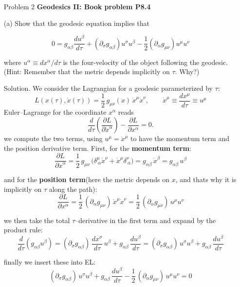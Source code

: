 \documentclass[12pt]{article}
\begin{document}
\newpage%
\begin{enumerate}
  \item[Problem 2] \textbf{Geodesics II: Book problem P8.4} 
  \item[(a)] Show that the geodesic equation implies that

  $$
  0=g_{\alpha \beta} \frac{d u^\beta}{d \tau}+\left(\partial_\sigma g_{\alpha \beta}\right) u^\sigma u^\beta-\frac{1}{2}\left(\partial_\alpha g_{\mu \nu}\right) u^\mu u^\nu
  $$
  
  where $u^\alpha \equiv d x^\alpha / d \tau$ is the four-velocity of the object following the geodesic. (Hint: Remember that the metric depends implicitly on $\tau$. Why?)

  \item[Solution.]
  We consider the Lagrangian for a geodesic parameterized by $\tau$:
\[
L(x(\tau),\dot x(\tau))=\frac12\,g_{\mu\nu}(x)\,\dot x^\mu \dot x^\nu,
\qquad \dot x^\mu \equiv \frac{dx^\mu}{d\tau} \equiv u^\mu
\]
Euler–Lagrange for the coordinate $x^\alpha$ reads
\[
\frac{d}{d\tau}\!\left(\frac{\partial L}{\partial \dot x^\alpha}\right)
-\frac{\partial L}{\partial x^\alpha}=0.
\]
we compute the two terms, using $u^\mu=\dot x^\mu$ to have the momentum term and the position derivative term. First, for the \textbf{momentum term}:
\[
\frac{\partial L}{\partial \dot x^\alpha}
=\frac12\,g_{\mu\nu}\,\big(\delta^\mu_{\ \alpha}\dot x^\nu+\dot x^\mu \delta^\nu_{\ \alpha}\big)
=g_{\alpha\beta}\,\dot x^\beta
=g_{\alpha\beta}\,u^\beta
\]

and for the \textbf{position term}(here the metric depends on $x$, and thats why it is implicitly on $\tau$ along the path):
\[
\frac{\partial L}{\partial x^\alpha}
=\frac12\,(\partial_\alpha g_{\mu\nu})\,\dot x^\mu \dot x^\nu
=\frac12\,(\partial_\alpha g_{\mu\nu})\,u^\mu u^\nu
\]

we then take the total $\tau$–derivative in the first term and expand by the product rule:
\[
\frac{d}{d\tau}\!\left(g_{\alpha\beta}u^\beta\right)
=(\partial_\sigma g_{\alpha\beta})\,\frac{dx^\sigma}{d\tau}\,u^\beta
+ g_{\alpha\beta}\,\frac{d u^\beta}{d\tau}
=(\partial_\sigma g_{\alpha\beta})\,u^\sigma u^\beta
+ g_{\alpha\beta}\,\frac{d u^\beta}{d\tau}
\]

finally we insert these into EL:
\[
(\partial_\sigma g_{\alpha\beta})\,u^\sigma u^\beta
+ g_{\alpha\beta}\,\frac{d u^\beta}{d\tau}
- \frac12\,(\partial_\alpha g_{\mu\nu})\,u^\mu u^\nu
=0
\]


\end{enumerate}
\end{document}
